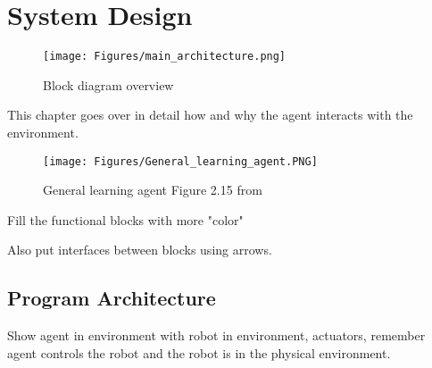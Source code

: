 \chapter{System Design} 
\label{chapter:System_Design}









\begin{figure}[H]
    \centering
    \texttt{[image: Figures/main\_architecture.png]}
    \caption{Block diagram overview }
    \label{fig:sysdiag}
\end{figure}

This chapter goes over in detail how and why the agent interacts with the environment. 


\begin{figure}[H]
    \centering
    \texttt{[image: Figures/General\_learning\_agent.PNG]}
    \caption{General learning agent Figure 2.15 from \cite{russell2016artificial}} 
    \label{fig:agent}
\end{figure}

Fill the functional blocks with more "color"

Also put interfaces between blocks using arrows.

\section{Program Architecture}

Show agent in environment with robot in environment, actuators, remember agent controls the robot and the robot is in the physical environment.

